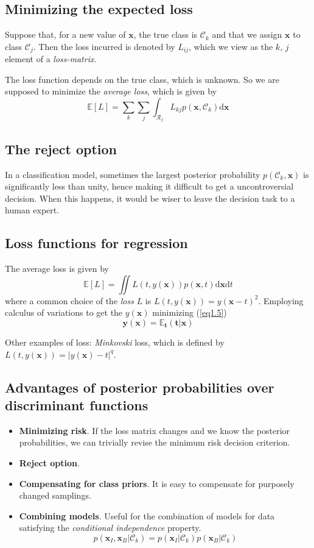 \documentclass[a4paper]{book}
\newcommand{\ud}{\mathrm{d}}
\renewcommand{\bf}{\mathbf}
\renewcommand{\cal}{\mathcal}
\newcommand{\bb}{\mathbb}
\newcommand{\imp}[1]{\textit{#1}}
\begin{document}
\subsection{Minimizing the expected loss}
Suppose that, for a new value of $\bf{x}$, the true class is $\cal{C}_k$ and that we assign $\bf{x}$ to class $\cal{C}_j$. Then the loss incurred is denoted by $L_{ij}$, which we view as the $k$, $j$ element of a \imp{loss-matrix}.

The loss function depends on the true class, which is unknown. So we are supposed to minimize the \textit{average loss}, which is given by
\begin{equation}
	\bb{E}[L]=\sum_k \sum_j \int_{\cal{R}_j} L_{kj} p(\bf{x},\cal{C}_k)\ud \bf{x}
\end{equation}

\subsection{The reject option}
In a classification model, sometimes the largest posterior probability $p(\cal{C}_k,\bf{x})$ is significantly less than unity, hence making it difficult to get a uncontroversial decision. When this happens, it would be wiser to leave the decision task to a human expert.
\subsection{Loss functions for regression}
The average loss is given by
\begin{equation}
	\bb{E}[L] = \iint L(t,y(\bf{x}))p(\bf{x},t)\ud \bf{x} \ud t \label{eq1.5}
\end{equation}
where a common choice of the \imp{loss} $L$ is $L(t,y(\bf{x}))={y(\bf{x}-t)}^2$. Employing calculus of variations to get the $y(\bf{x})$ minimizing (\ref{eq1.5})
\begin{equation}
	\bf{y}(\bf{x}) = \bb{E}_{\bf{t}}(\bf{t}|\bf{x})
\end{equation}

Other examples of loss: \imp{Minkovski} loss, which is defined by $L(t,y(\bf{x}))=|y(\bf{x})-t|^q$.
\subsection{Advantages of posterior probabilities over discriminant functions}
\begin{itemize}
\item \textbf{Minimizing risk}. If the loss matrix changes and we know the posterior probabilities, we can trivially revise the minimum risk decision criterion.\\
\item \textbf{Reject option}.\\
\item \textbf{Compensating for class priors}. It is easy to compensate for purposely changed samplings.\\
\item \textbf{Combining models}. Useful for the combination of models for data satisfying the \textit{conditional independence} property.
\[
p(\bf{x}_I,\bf{x}_B|\cal{C}_k)=p(\bf{x}_I|\cal{C}_k)p(\bf{x}_B|\cal{C}_k)
\]
\end{itemize}
\end{document}
